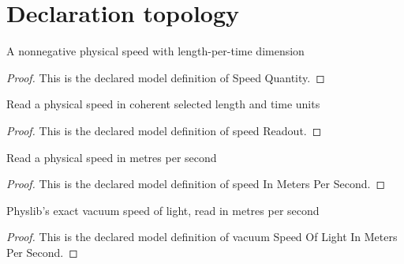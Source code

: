 \section{Declaration topology}
\begin{definition}
  \label{def:physics:phyx-mini-0621:phyxminiproblems-problemphyxmini0621-speedquantity}
  A nonnegative physical speed with length-per-time dimension
\end{definition}
\begin{proof}
  This is the declared model definition of Speed Quantity.
\end{proof}
\begin{definition}
  \label{def:physics:phyx-mini-0621:phyxminiproblems-problemphyxmini0621-speedreadout}
  Read a physical speed in coherent selected length and time units
\end{definition}
\begin{proof}
  This is the declared model definition of speed Readout.
\end{proof}
\begin{definition}
  \label{def:physics:phyx-mini-0621:phyxminiproblems-problemphyxmini0621-speedinmeterspersecond}
  Read a physical speed in metres per second
\end{definition}
\begin{proof}
  This is the declared model definition of speed In Meters Per Second.
\end{proof}
\begin{definition}
  \label{def:physics:phyx-mini-0621:phyxminiproblems-problemphyxmini0621-vacuumspeedoflightinmeterspersecond}
  Physlib's exact vacuum speed of light, read in metres per second
\end{definition}
\begin{proof}
  This is the declared model definition of vacuum Speed Of Light In Meters Per Second.
\end{proof}
